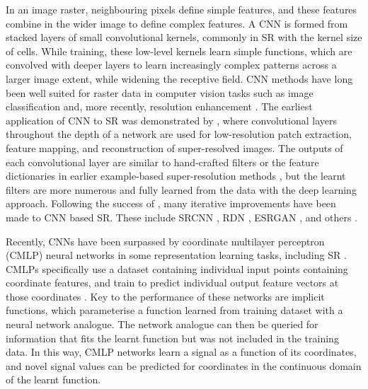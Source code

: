\documentclass[manuscript.tex]{subfiles}
\begin{document}
In an image raster, neighbouring pixels define simple features, and these features combine in the wider image to define complex features.
A CNN is formed from stacked layers of small convolutional kernels, commonly in SR with the kernel size of  cells.
While training, these low-level kernels learn simple functions, which are convolved with deeper layers to learn increasingly complex patterns across a larger image extent, while widening the receptive field.
CNN methods have long been well suited for raster data in computer vision tasks such as image classification \parencite[e.g.][]{simonyanVeryDeepConvolutional2015} and, more recently, resolution enhancement \parencite[e.g.][]{zhangResidualDenseNetwork2018}.
The earliest application of CNN to SR was demonstrated by \textcite{dongLearningDeepConvolutional2014}, where convolutional layers throughout the depth of a network are used for low-resolution patch extraction, feature mapping, and reconstruction of super-resolved images.
The outputs of each convolutional layer are similar to hand-crafted filters or the feature dictionaries in earlier example-based super-resolution methods \parencite{freemanExamplebasedSuperresolution2002}, but the learnt filters are more numerous and fully learned from the data with the deep learning approach.
Following the success of \parencite{dongLearningDeepConvolutional2014}, many iterative improvements have been made to CNN based SR\@.
These include SRCNN \parencite{dongImageSuperresolutionUsing2016}, RDN \parencite{zhangResidualDenseNetwork2018}, ESRGAN \parencite{wangESRGANEnhancedSuperresolution2018}, and others \parencite{ledigPhotorealisticSingleImage2017,limEnhancedDeepResidual2017}.


Recently, CNNs have been surpassed by coordinate multilayer perceptron (CMLP) neural networks in some representation learning tasks, including SR \parencite{chenLearningContinuousImage2021}.
CMLPs specifically use a dataset containing individual input points containing coordinate features, and train to predict individual output feature vectors at those coordinates \parencite[e.g.][]{mildenhallNeRFRepresentingScenes2020}.
Key to the performance of these networks are implicit functions, which parameterise a function learned from training dataset with a neural network analogue.
The network analogue can then be queried for information that fits the learnt function but was not included in the training data.
In this way, CMLP networks learn a signal as a function of its coordinates, and novel signal values can be predicted for coordinates in the continuous domain of the learnt function.
\end{document}
